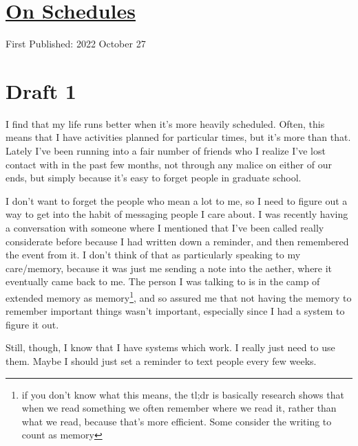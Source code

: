 \documentclass[12pt]{article}[titlepage]
\renewcommand{\,}{\textsuperscript{,}}
\begin{document}
\doublespacing
\section{\href{schedules.html}{On Schedules}}
First Published: 2022 October 27

\section{Draft 1}
I find that my life runs better when it's more heavily scheduled.
Often, this means that I have activities planned for particular times, but it's more than that.
Lately I've been running into a fair number of friends who I realize I've lost contact with in the past few months, not through any malice on either of our ends, but simply because it's easy to forget people in graduate school.

I don't want to forget the people who mean a lot to me, so I need to figure out a way to get into the habit of messaging people I care about.
I was recently having a conversation with someone where I mentioned that I've been called really considerate before because I had written down a reminder, and then remembered the event from it.
I don't think of that as particularly speaking to my care/memory, because it was just me sending a note into the aether, where it eventually came back to me.
The person I was talking to is in the camp of extended memory as memory\footnote{if you don't know what this means, the tl;dr is basically research shows that when we read something we often remember where we read it, rather than what we read, because that's more efficient. Some consider the writing to count as memory}, and so assured me that not having the memory to remember important things wasn't important, especially since I had a system to figure it out.

Still, though, I know that I have systems which work. I really just need to use them.
Maybe I should just set a reminder to text people every few weeks.
\end{document}
